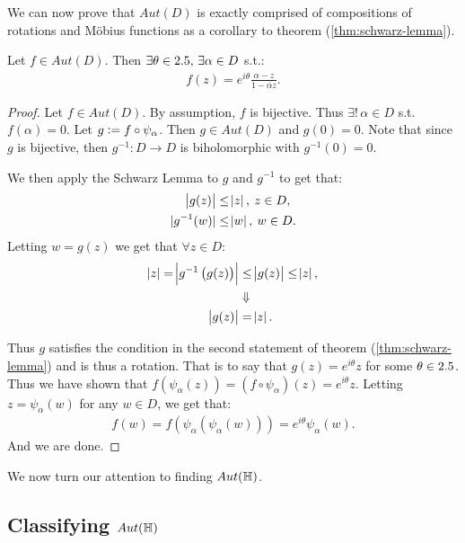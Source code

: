 We can now prove that $Aut(D)$ is exactly comprised of compositions of rotations and M{\"o}bius functions as a corollary to theorem (\ref{thm:schwarz-lemma}).


\begin{corollary}\label{cor:aut-D-exist}
Let $f \in Aut(D)$. Then $\exists \theta \in 2.5, \, \exists \alpha \in D$ s.t.:
\begin{align*}
    f(z) = e^{i \theta} \frac{\alpha - z}{1 - \overline{\alpha } z}.
\end{align*}
\end{corollary}

\begin{proof}
Let $f \in Aut(D)$. By assumption, $f$ is bijective. Thus $\exists ! \, \alpha \in D$ s.t. $ f(\alpha) = 0$. Let $g \vcentcolon = f \circ \psi_\alpha$. Then $g \in Aut(D)$ and $g(0) = 0$. Note that since $g$ is bijective, then $g^{-1} : D \to D$ is biholomorphic with $g^{-1}(0) = 0$.

We then apply the Schwarz Lemma to $g$ and $g^{-1}$ to get that:
\begin{align*}
    \abs{g(z)} &\leq \abs{z}, \: z \in D,\\
    |g^{-1} ( w) | &\leq \abs{w}, \: w \in D.
\end{align*}
Letting $w = g(z)$ we get that $\forall z \in D$:
\begin{align*}
    \abs{z} = \abs{g^{-1} \left( g(z) \right)   } &\leq \abs{g(z)} \leq \abs{z},\\
    &\Downarrow\\
    \abs{g(z)} &= \abs{z}.
\end{align*}

Thus $g$ satisfies the condition in the second statement of theorem (\ref{thm:schwarz-lemma}) and is thus a rotation. That is to say that $g(z) = e^{i \theta} z $ for some $\theta \in 2.5$. Thus we have shown that $f \left( \psi_\alpha (z) \right) = \left( f \circ \psi_\alpha \right) (z) = e^{i \theta} z$. Letting $z = \psi_\alpha (w)$ for any $w \in D$, we get that:
\begin{align*}
   f(w) = f \left( \psi_\alpha \left( \psi_\alpha (w) \right) \right) = e^{i \theta} \psi_\alpha (w).
\end{align*}
And we are done.
\end{proof}




We now turn our attention to finding $Aut(\mathbb{H})$.

\subsection{Classifying $Aut(\mathbb{H})$}

